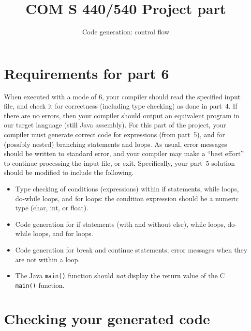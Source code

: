 \documentclass{article}
\title{COM S 440/540 Project part \flowgen}
\author{Code generation: control flow}
\date{}
\newcommand{\typecheck}{4}
\newcommand{\codegen}{5}
\newcommand{\flowgen}{6}
\begin{document}
\maketitle

\section{Requirements for part \flowgen{}}

When executed with a mode of \flowgen{},
your compiler should read the specified input file,
and check it for correctness (including type checking) as done in part~\typecheck.
If there are no errors, then your compiler should output
an equivalent program in our target language
(still Java assembly).
For this part of the project,
your compiler must generate correct code for expressions (from part~\codegen),
and for (possibly nested) branching statements and loops.
As usual,
error messages should be written to standard error,
and your compiler may make a ``best effort'' to continue processing
the input file, or exit.
Specifically, your part~\codegen{} solution should be modified to include
the following.
\begin{itemize}
  \item Type checking of conditions (expressions) within
        if statements, while loops, do-while loops, and
        for loops: the condition expression should be a numeric type
        (char, int, or float).

  \item Code generation for
        if statements (with and without else),
        while loops,
        do-while loops,
        and for loops.

  \item Code generation for break and continue statements;
        error messages when they are not within a loop.

  \item The Java {\tt main()} function should \emph{not}
        display the return value of the C {\tt main()} function.
\end{itemize}

\section{Checking your generated code} \label{SEC:checking}
\end{document}
